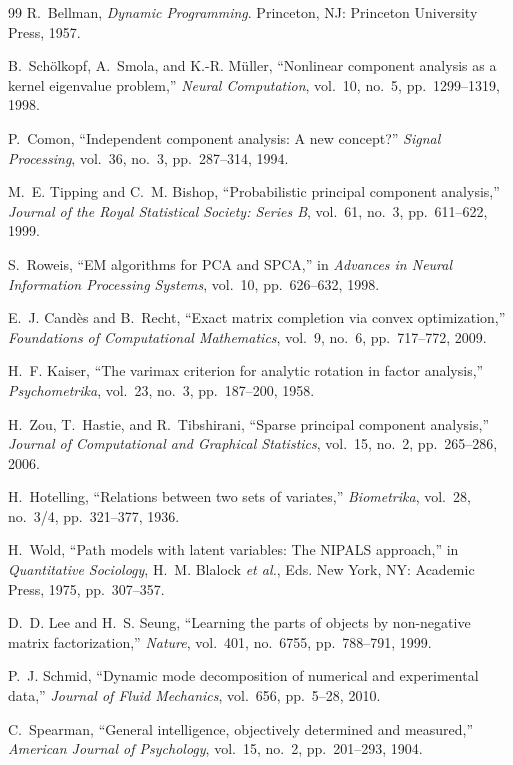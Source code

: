 \documentclass[conference]{IEEEtran}
\begin{document}
\begin{thebibliography}{99}
R.~Bellman, \textit{Dynamic Programming}. Princeton, NJ: Princeton University Press, 1957.

B.~Sch\"{o}lkopf, A.~Smola, and K.-R. M\"{u}ller, ``Nonlinear component analysis as a kernel eigenvalue problem,'' \textit{Neural Computation}, vol.~10, no.~5, pp.~1299--1319, 1998.

P.~Comon, ``Independent component analysis: A new concept?'' \textit{Signal Processing}, vol.~36, no.~3, pp.~287--314, 1994.

M.~E. Tipping and C.~M. Bishop, ``Probabilistic principal component analysis,'' \textit{Journal of the Royal Statistical Society: Series B}, vol.~61, no.~3, pp.~611--622, 1999.

S.~Roweis, ``EM algorithms for PCA and SPCA,'' in \textit{Advances in Neural Information Processing Systems}, vol.~10, pp.~626--632, 1998.

E.~J. Cand\`{e}s and B.~Recht, ``Exact matrix completion via convex optimization,'' \textit{Foundations of Computational Mathematics}, vol.~9, no.~6, pp.~717--772, 2009.

H.~F. Kaiser, ``The varimax criterion for analytic rotation in factor analysis,'' \textit{Psychometrika}, vol.~23, no.~3, pp.~187--200, 1958.

H.~Zou, T.~Hastie, and R.~Tibshirani, ``Sparse principal component analysis,'' \textit{Journal of Computational and Graphical Statistics}, vol.~15, no.~2, pp.~265--286, 2006.

H.~Hotelling, ``Relations between two sets of variates,'' \textit{Biometrika}, vol.~28, no.~3/4, pp.~321--377, 1936.

H.~Wold, ``Path models with latent variables: The NIPALS approach,'' in \textit{Quantitative Sociology}, H.~M. Blalock \textit{et al.}, Eds. New York, NY: Academic Press, 1975, pp.~307--357.

D.~D. Lee and H.~S. Seung, ``Learning the parts of objects by non-negative matrix factorization,'' \textit{Nature}, vol.~401, no.~6755, pp.~788--791, 1999.

P.~J. Schmid, ``Dynamic mode decomposition of numerical and experimental data,'' \textit{Journal of Fluid Mechanics}, vol.~656, pp.~5--28, 2010.

C.~Spearman, ``General intelligence, objectively determined and measured,'' \textit{American Journal of Psychology}, vol.~15, no.~2, pp.~201--293, 1904.


\end{thebibliography}
\end{document}
